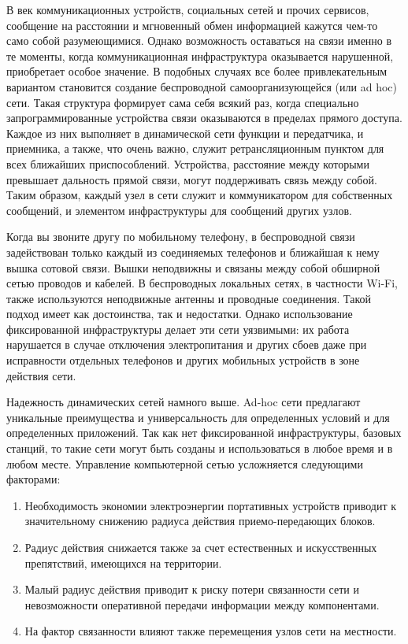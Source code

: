 В век коммуникационных устройств, социальных сетей и прочих сервисов, сообщение на расстоянии и мгновенный обмен информацией кажутся чем-то само собой разумеющимися. Однако возможность оставаться на связи именно в те моменты, когда коммуникационная инфраструктура оказывается нарушенной, приобретает особое значение. В подобных случаях все более привлекательным вариантом становится создание беспроводной самоорганизующейся (или ad hoc) сети. Такая структура формирует сама себя всякий раз, когда специально запрограммированные устройства связи оказываются в пределах прямого доступа. Каждое из них выполняет в динамической сети функции и передатчика, и приемника, а также, что очень важно, служит ретрансляционным пунктом для всех ближайших приспособлений. Устройства, расстояние между которыми превышает дальность прямой связи, могут поддерживать связь между собой. Таким образом, каждый узел в сети служит и коммуникатором для собственных сообщений, и элементом инфраструктуры для сообщений других узлов.

Когда вы звоните другу по мобильному телефону, в беспроводной связи задействован только каждый из соединяемых телефонов и ближайшая к нему
вышка сотовой связи. Вышки неподвижны и связаны между собой обширной сетью проводов и кабелей. В беспроводных локальных сетях, в частности Wi-Fi, также используются неподвижные антенны и проводные соединения. Такой подход имеет как достоинства, так и недостатки. Однако использование фиксированной инфраструктуры делает эти сети уязвимыми: их работа нарушается в случае отключения электропитания и других сбоев даже при исправности отдельных телефонов и других мобильных устройств в зоне действия сети.

Надежность динамических сетей намного выше. Ad-hoc сети предлагают уникальные преимущества и универсальность для определенных условий и для определенных приложений. Так как нет фиксированной инфраструктуры, базовых станций, то такие сети могут быть созданы и использоваться в любое время и в любом месте. Управление компьютерной сетью усложняется следующими факторами:
\begin{enumerate}
\item Необходимость экономии электроэнергии портативных устройств приводит к значительному снижению радиуса действия приемо-передающих блоков.
\item Радиус действия снижается также за счет естественных и искусственных препятствий, имеющихся на территории.
\item Малый радиус действия приводит к риску потери связанности сети и невозможности оперативной передачи информации между компонентами.
\item На фактор связанности влияют также перемещения узлов сети на местности.
\end{enumerate}

